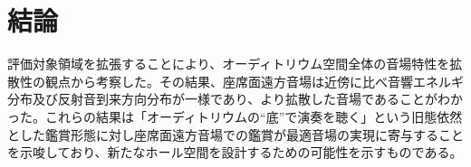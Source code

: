 \chapter{結論}
評価対象領域を拡張することにより、オーディトリウム空間全体の音場特性を拡散性の観点から考察した。その結果、座席面遠方音場は近傍に比べ音響エネルギ分布及び反射音到来方向分布が一様であり、より拡散した音場であることがわかった。これらの結果は「オーディトリウムの“底”で演奏を聴く」という旧態依然とした鑑賞形態に対し座席面遠方音場での鑑賞が最適音場の実現に寄与することを示唆しており、新たなホール空間を設計するための可能性を示すものである。